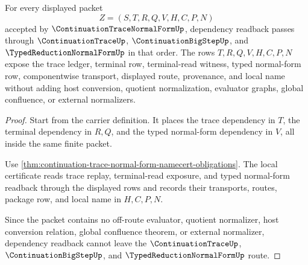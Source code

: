 \begin{theorem}
\label{thm:continuation-trace-normal-form-dependency-readback-obligation}
For every displayed packet
$$
Z=(S,T,R,Q,V,H,C,P,N)
$$
accepted by $\ContinuationTraceNormalFormUp$, dependency readback passes through $\ContinuationTraceUp$, $\ContinuationBigStepUp$, and $\TypedReductionNormalFormUp$ in that order. The rows $T,R,Q,V,H,C,P,N$ expose the trace ledger, terminal row, terminal-read witness, typed normal-form row, componentwise transport, displayed route, provenance, and local name without adding host conversion, quotient normalization, evaluator graphs, global confluence, or external normalizers.
\end{theorem}
\begin{proof}
Start from the carrier definition. It places the trace dependency in $T$, the terminal dependency in $R,Q$, and the typed normal-form dependency in $V$, all inside the same finite packet.

Use \autoref{thm:continuation-trace-normal-form-namecert-obligations}. The local certificate reads trace replay, terminal-read exposure, and typed normal-form readback through the displayed rows and records their transports, routes, package row, and local name in $H,C,P,N$.

Since the packet contains no off-route evaluator, quotient normalizer, host conversion relation, global confluence theorem, or external normalizer, dependency readback cannot leave the $\ContinuationTraceUp$, $\ContinuationBigStepUp$, and $\TypedReductionNormalFormUp$ route.
\end{proof}

